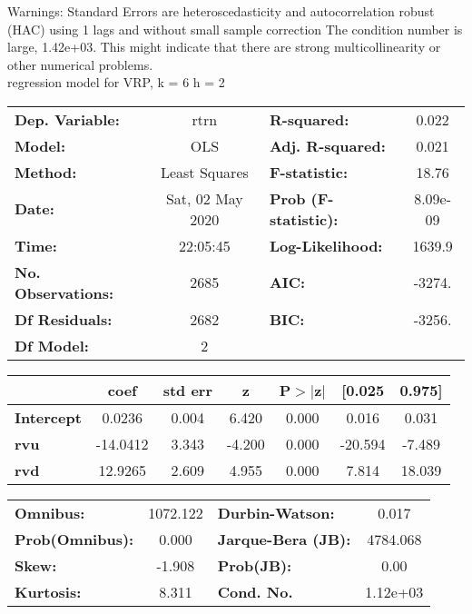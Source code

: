 Warnings: \newline
 [1] Standard Errors are heteroscedasticity and autocorrelation robust (HAC) using 1 lags and without small sample correction \newline
 [2] The condition number is large, 1.42e+03. This might indicate that there are \newline
 strong multicollinearity or other numerical problems.\\ 

regression model for VRP, k = 6 h = 2\begin{center}
\begin{tabular}{lclc}
\toprule
\textbf{Dep. Variable:}    &       rtrn       & \textbf{  R-squared:         } &     0.022   \\
\textbf{Model:}            &       OLS        & \textbf{  Adj. R-squared:    } &     0.021   \\
\textbf{Method:}           &  Least Squares   & \textbf{  F-statistic:       } &     18.76   \\
\textbf{Date:}             & Sat, 02 May 2020 & \textbf{  Prob (F-statistic):} &  8.09e-09   \\
\textbf{Time:}             &     22:05:45     & \textbf{  Log-Likelihood:    } &    1639.9   \\
\textbf{No. Observations:} &        2685      & \textbf{  AIC:               } &    -3274.   \\
\textbf{Df Residuals:}     &        2682      & \textbf{  BIC:               } &    -3256.   \\
\textbf{Df Model:}         &           2      & \textbf{                     } &             \\
\bottomrule
\end{tabular}
\begin{tabular}{lcccccc}
                   & \textbf{coef} & \textbf{std err} & \textbf{z} & \textbf{P$> |$z$|$} & \textbf{[0.025} & \textbf{0.975]}  \\
\midrule
\textbf{Intercept} &       0.0236  &        0.004     &     6.420  &         0.000        &        0.016    &        0.031     \\
\textbf{rvu}       &     -14.0412  &        3.343     &    -4.200  &         0.000        &      -20.594    &       -7.489     \\
\textbf{rvd}       &      12.9265  &        2.609     &     4.955  &         0.000        &        7.814    &       18.039     \\
\bottomrule
\end{tabular}
\begin{tabular}{lclc}
\textbf{Omnibus:}       & 1072.122 & \textbf{  Durbin-Watson:     } &    0.017  \\
\textbf{Prob(Omnibus):} &   0.000  & \textbf{  Jarque-Bera (JB):  } & 4784.068  \\
\textbf{Skew:}          &  -1.908  & \textbf{  Prob(JB):          } &     0.00  \\
\textbf{Kurtosis:}      &   8.311  & \textbf{  Cond. No.          } & 1.12e+03  \\
\bottomrule
\end{tabular}
\end{center}

